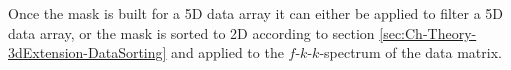 Once the mask is built for a 5D data array it can either be applied to filter a 5D data array, or the mask is sorted to 2D according to section \ref{sec:Ch-Theory-3dExtension-DataSorting} and applied to the $f$-$k$-$k$-spectrum of the data matrix.


















